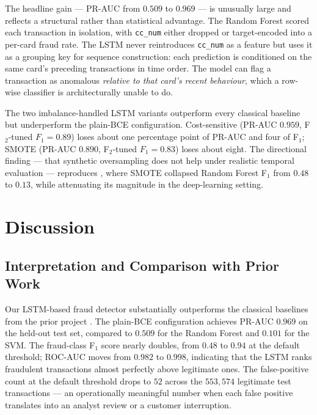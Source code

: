 \documentclass[oneside,12pt,parskip=half,american,numbers=noenddot]{scrreprt}
\begin{document}
The headline gain — PR-AUC from $0.509$ to $0.969$ — is unusually large and reflects a structural rather than statistical advantage. The Random Forest scored each transaction in isolation, with \texttt{cc\_num} either dropped or target-encoded into a per-card fraud rate. The LSTM never reintroduces \texttt{cc\_num} as a feature but uses it as a grouping key for sequence construction: each prediction is conditioned on the same card's preceding transactions in time order. The model can flag a transaction as anomalous \emph{relative to that card's recent behaviour}, which a row-wise classifier is architecturally unable to do.

The two imbalance-handled LSTM variants outperform every classical baseline but underperform the plain-BCE configuration. Cost-sensitive (PR-AUC $0.959$, F\(_2\)-tuned $F_1 = 0.89$) loses about one percentage point of PR-AUC and four of F\(_1\); SMOTE (PR-AUC $0.890$, F\(_2\)-tuned $F_1 = 0.83$) loses about eight. The directional finding — that synthetic oversampling does not help under realistic temporal evaluation — reproduces \parencite{Du2026MLFraud}, where SMOTE collapsed Random Forest F\(_1\) from $0.48$ to $0.13$, while attenuating its magnitude in the deep-learning setting.


\pagebreak
\chapter{Discussion}\label{ch:discussion}

\section{Interpretation and Comparison with Prior Work}
\label{sec:interpretation}

Our LSTM-based fraud detector substantially outperforms the classical baselines from the prior project \parencite{Du2026MLFraud}. The plain-BCE configuration achieves PR-AUC $0.969$ on the held-out test set, compared to $0.509$ for the Random Forest and $0.101$ for the SVM. The fraud-class F\(_1\) score nearly doubles, from $0.48$ to $0.94$ at the default threshold; ROC-AUC moves from $0.982$ to $0.998$, indicating that the LSTM ranks fraudulent transactions almost perfectly above legitimate ones. The false-positive count at the default threshold drops to $52$ across the $553{,}574$ legitimate test transactions — an operationally meaningful number when each false positive translates into an analyst review or a customer interruption.
\end{document}
